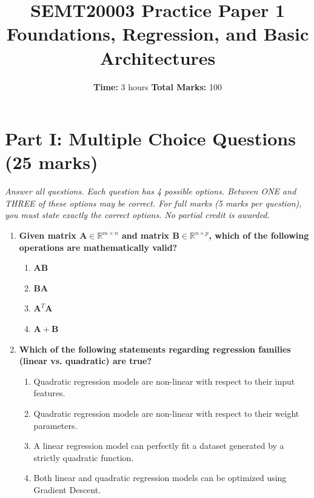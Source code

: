 \documentclass[11pt]{article}
\title{\textbf{SEMT20003 Practice Paper 1}\\ Foundations, Regression, and Basic Architectures}
\author{}
\date{\textbf{Time:} 3 hours \quad \textbf{Total Marks:} 100}
\begin{document}
\maketitle

\section*{Part I: Multiple Choice Questions (25 marks)}
\textit{Answer all questions. Each question has 4 possible options. Between ONE and THREE of these options may be correct. For full marks (5 marks per question), you must state exactly the correct options. No partial credit is awarded.}

\begin{enumerate}
    \item \textbf{Given matrix $\mathbf{A} \in \mathbb{R}^{m \times n}$ and matrix $\mathbf{B} \in \mathbb{R}^{n \times p}$, which of the following operations are mathematically valid?}
    \begin{enumerate}
        \item[A)] $\mathbf{A}\mathbf{B}$
        \item[B)] $\mathbf{B}\mathbf{A}$
        \item[C)] $\mathbf{A}^T\mathbf{A}$
        \item[D)] $\mathbf{A} + \mathbf{B}$
    \end{enumerate}
    \vspace{0.5cm}

    \item \textbf{Which of the following statements regarding regression families (linear vs. quadratic) are true?}
    \begin{enumerate}
        \item[A)] Quadratic regression models are non-linear with respect to their input features.
        \item[B)] Quadratic regression models are non-linear with respect to their weight parameters.
        \item[C)] A linear regression model can perfectly fit a dataset generated by a strictly quadratic function.
        \item[D)] Both linear and quadratic regression models can be optimized using Gradient Descent.
    \end{enumerate}
    \vspace{0.5cm}


\end{enumerate}
\end{document}
